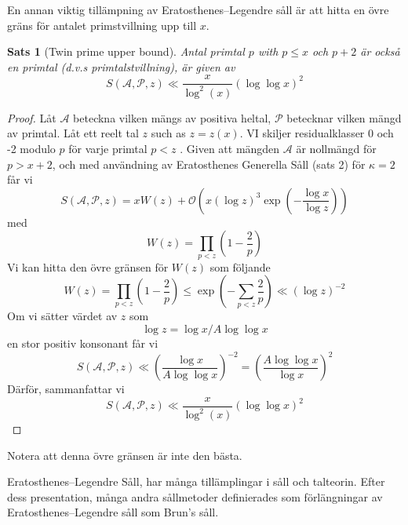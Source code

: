 \documentclass[12pt,a4paper]{article}
\newcommand{\A}{\mathcal{A}}
\renewcommand{\P}{\mathcal{P}}
\renewcommand{\S}[3]{S(\mathcal{#1}, \mathcal{#2}, #3)}
\newtheorem{theorem}{Sats}[section]
\newtheorem{proof}{Bevis}
\begin{document}
En annan viktig tillämpning av Eratosthenes–Legendre såll är att hitta en övre gräns för antalet primstvillning upp till $ x $.
\begin{theorem}[Twin prime upper bound\cite{Aliram}]\hfill

Antal primtal $ p $ with $ p\leq x $ och $ p+2 $ är också en primtal (d.v.s primtalstvillning), är given av
\[\S\A\P z \ll\frac{x}{\log^{2}(x)}(\log\log x)^{2}\]
\end{theorem}
\begin{proof}
Låt $ \A $ beteckna vilken mängs av positiva heltal, $ \P $ betecknar vilken mängd av primtal. Låt ett reelt tal $ z $ such as $ z=z(x) $. VI skiljer residualklasser 0 och -2 modulo $ p $ för varje primtal $ p<z $ . Given att mängden $ \A $ är nollmängd för $ p>x+2 $, och med användning av Eratosthenes Generella Såll (sats 2) för $ \kappa=2 $ får vi
\[\S\A\P z = xW(z)+\mathcal{O} \left( x(\log z)^{3} \exp \left( -\frac{\log x}{\log z}\right) \right)\]
med
\[W(z)=\prod_{p<z}\left( 1-\frac{2}{p}\right)\]
Vi kan hitta den övre gränsen för $ W(z) $ som följande
\[W(z)=\prod_{p<z}\left( 1-\frac{2}{p}\right)\leq\exp \left( -\sum_{p<z}\frac{2}{p} \right)\ll (\log z)^{-2}\]
Om vi sätter värdet av $ z $ som
\[\log z = \log x/A\log\log x\]en stor positiv konsonant
får vi  
\[\S\A\P z \ll \left( \frac{\log x}{A\log\log x} \right)^{-2}=\left( \frac{A\log\log x}{\log x} \right)^{2}\]
Därför, sammanfattar vi
\[\S\A\P z \ll\frac{x}{\log^{2}(x)}(\log\log x)^{2}\]
\end{proof}
Notera att denna övre gränsen är inte den bästa. 
 


Eratosthenes–Legendre Såll, har många tillämplingar i såll och talteorin. Efter dess presentation, många andra sållmetoder definierades som förlängningar av Eratosthenes–Legendre såll som Brun's såll.

\printbibliography






\end{document}
